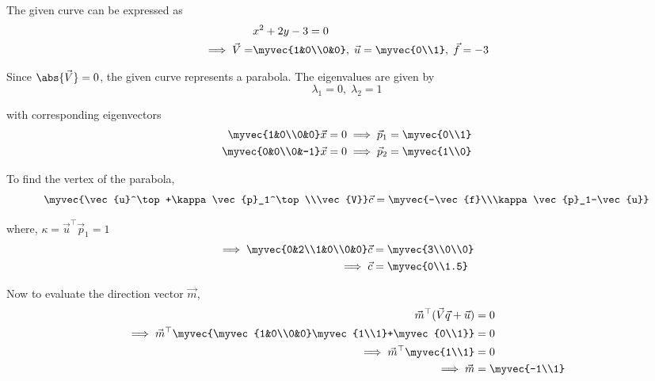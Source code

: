 The given curve can be expressed as 
\begin{align}
    &x^2+2y-3=0\\
    \implies \vec{V} = &\myvec{1&0\\0&0},\; \vec{u} = \myvec{0\\1},\; \vec{f} = -3
\end{align}

Since $\abs{\vec{V}} = 0$, the given curve represents a parabola. The eigenvalues are given by 
\begin{equation}
    \lambda_1 = 0, \; \lambda_2 = 1
\end{equation}

with corresponding eigenvectors 
\begin{align}
    \myvec{1&0\\0&0}\vec{x} = 0 \implies \vec{p}_1 = \myvec{0\\1}\\
    \myvec{0&0\\0&-1}\vec{x} = 0 \implies \vec{p}_2 = \myvec{1\\0}
\end{align}

To find the vertex of the parabola,
\begin{equation}
    \myvec{\vec{u}^\top+\kappa \vec{p}_1^\top\\\vec{V}}\vec{c} = \myvec{-\vec{f}\\\kappa \vec{p}_1-\vec{u}}
\end{equation}

where, $\kappa = \vec{u}^\top\vec{p}_1 = 1$
\begin{align}
    \implies \myvec{0&2\\1&0\\0&0}\vec{c} &= \myvec{3\\0\\0}\\
    \implies \vec{c} &= \myvec{0\\1.5}
\end{align}

Now to evaluate the direction vector $\vec{m}$,
\begin{align}
    \vec{m}^\top (\vec{V}\vec{q}+\vec{u}) &= 0\\
    \implies \vec{m}^\top \myvec{\myvec{1&0\\0&0}\myvec{1\\1}+\myvec{0\\1}} &= 0\\
    \implies \vec{m}^\top \myvec{1\\1} &= 0\\
    \implies \vec{m} &= \myvec{-1\\1}
\end{align}

